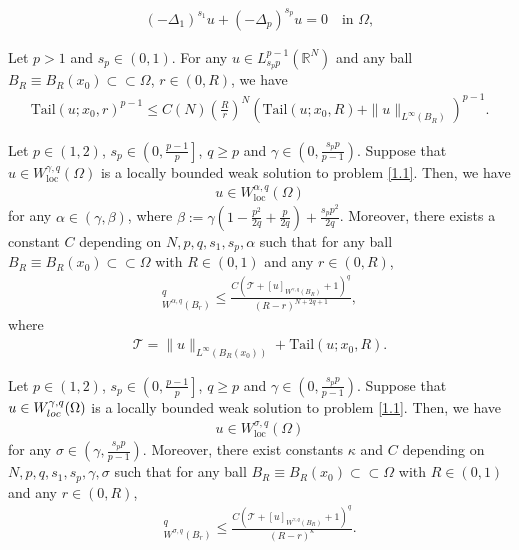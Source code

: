 \documentclass[10pt,a4paper]{amsart}
\begin{document}
\begin{align}
	\label{1.1}
	(-\Delta_1)^{s_1}u+(-\Delta_p)^{s_p}u=0\quad\text{in }\Omega,
\end{align}

\begin{lemma}
	\label{lem4}
	Let $p>1$ and $s_p\in (0, 1)$. For any $u\in L^{p-1}_{s_pp}(\mathbb{R}^N)$ and any ball $B_R\equiv B_R(x_0)\subset\subset\Omega$, $r\in (0,R)$, we have
	\begin{align*}
		\mathrm{Tail}(u;x_0,r)^{p-1}\le C(N)\left( \frac{R}{r}\right)^N\left( \mathrm{Tail}(u;x_0,R)+\|u\|_{L^\infty(B_R)}\right)^{p-1}. 
	\end{align*}
\end{lemma}

\begin{lemma}
	\label{lem11}
	Let $p\in(1, 2)$, $s_p\in\left( 0, \frac{p-1}{p}\right]$, $q\ge p$ and $\gamma\in \left( 0, \frac{s_p p}{p-1}\right)$. Suppose that $u\in W^{\gamma,q}_\mathrm{loc}(\Omega)$ is a locally bounded weak solution to problem \eqref{1.1}. Then, we have
	\begin{align*}
		u\in W^{\alpha,q}_{\mathrm{loc}}(\Omega)
	\end{align*}
	for any $\alpha\in (\gamma,\beta)$, where $\beta:=\gamma\left( 1-\frac{p^2}{2q}+\frac{p}{2q}\right)+\frac{s_pp^2}{2q}$.
	Moreover, there exists a constant $C$ depending on $N,p,q,s_1,s_p,\alpha$ such that for any ball $B_R\equiv B_R(x_0)\subset\subset\Omega$ with $R\in(0,1)$ and any $r\in(0,R)$,
	\begin{align*}
		[u]^q_{W^{\alpha,q}(B_r)}\le \frac{C\left( \mathcal{T}+[u]_{W^{\gamma,q}(B_R)}+1\right)^q }{(R-r)^{N+2q+1}},
	\end{align*}
	where
	\begin{align*}
		\mathcal{T}=\|u\|_{L^\infty(B_{R}(x_0))}+\mathrm{Tail}(u;x_0,R).
	\end{align*}
\end{lemma}

\begin{lemma}\label{lem12}
	Let $p\in(1,2)$, $s_p\in \left(0,\frac{p-1}{p}\right]$, $q\geq p$ and $\gamma\in \left( 0, \frac{s_pp}{p-1}\right) $. Suppose that $u \in W_{\rm loc}^{\gamma, q}(\Omega)$ is a 
	locally bounded weak solution to problem \eqref{1.1}. Then, we have 	
	\begin{align*}
		u \in W_{\mathrm{loc}}^{\sigma, q}(\Omega)
	\end{align*}
	for any $\sigma \in\left(\gamma, \frac{s_p p}{p-1}\right)$. Moreover, there exist constants $\kappa$ and $C$ depending on $N,p,q,s_1,s_p,\gamma,\sigma$ such that for any ball $B_R\equiv B_R(x_0)\subset\subset\Omega$ with $R\in(0,1)$ and any $r\in(0,R)$,
	\begin{align*}
		[u]_{W^{\sigma, q}\left(B_r\right)}^q \leq \frac{C\left(\mathcal{T}+[u]_{W^{\gamma, q}\left(B_R\right)}+1\right)^q}{(R-r)^{\kappa}}.
	\end{align*}
\end{lemma}
\end{document}
